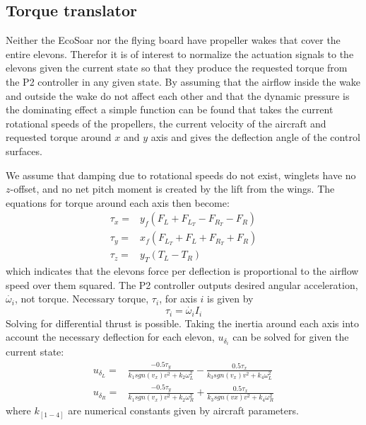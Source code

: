 \documentclass{article}
\begin{document}
\subsection{Torque translator}
Neither the EcoSoar nor the flying board have propeller wakes that cover the entire elevons.
Therefor it is of interest to normalize the actuation signals to the elevons given the current state so that they produce the requested torque from the P2 controller in any given state.
By assuming that the airflow inside the wake and outside the wake do not affect each other and that the dynamic pressure is the dominating effect a simple function can be found that takes the current rotational speeds of the propellers, the current velocity of the aircraft and requested torque around $x$ and $y$ axis and gives the deflection angle of the control surfaces.

We assume that damping due to rotational speeds do not exist, winglets have no $z$-offset, and no net pitch moment is created by the lift from the wings.
The equations for torque around each axis then become:
\begin{equation}
\begin{split}
    \tau_x =& y_f ( F_L + F_{L_T} - F_{R_T} -F_R) \\
    \tau_y =& x_f ( F_{L_T} + F_L + F_{R_T} + F_R) \\
    \tau_z =& y_T ( T_L - T_R)
\end{split}
\end{equation}
which indicates that the elevons force per deflection is proportional to the airflow speed over them squared.
The P2 controller outputs desired angular acceleration, $\dot{\omega_i}$, not torque.
Necessary torque, $\tau_i$, for axis $i$ is given by
\begin{equation}
    \tau_i = \dot{\omega_i} I_i
\end{equation}
Solving for differential thrust is possible.
Taking the inertia around each axis into account the necessary deflection for each elevon, $u_{\delta_i}$ can be solved for given the current state:
\begin{equation}
\begin{split}
    u_{\delta_L} =& \frac{-0.5 \tau_y}{k_1 sgn(v_x) v^2 + k_2 \omega_L^2} - \frac{0.5 \tau_x}{k_3 sgn(v_x) v^2 + k_4\omega_L^2} \\
    u_{\delta_R} =& \frac{-0.5 \tau_y}{k_1 sgn(v_x) v^2 + k_2 \omega_R^2} + \frac{0.5 \tau_x}{k_3 sgn(vx) v^2 + k_4 \omega_R^2} 
\end{split}
\label{eq:TT}
\end{equation}
where $k_{[1-4]}$ are numerical constants given by aircraft parameters.
\end{document}
